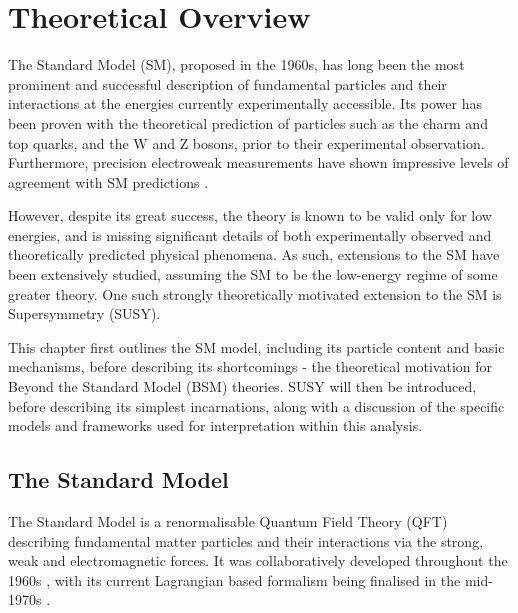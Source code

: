 
\chapter{Theoretical Overview}
\label{ch:theory}

\ifpdf
    \graphicspath{{Chapter2/Figs/Raster/}{Chapter2/Figs/PDF/}{Chapter2/Figs/}}
\else
    \graphicspath{{Chapter2/Figs/Vector/}{Chapter2/Figs/}}
\fi



The Standard Model (SM), proposed in the 1960s, has long been the most prominent and
successful description of fundamental particles and their interactions at the
energies currently experimentally accessible. Its power has been proven with the 
theoretical prediction of particles such as the charm and top quarks, and the W
and Z bosons, prior to their experimental observation. Furthermore, precision 
electroweak measurements have shown impressive levels of  agreement with SM
predictions \cite{ALEPH:2010aa}.

However, despite its great success, the theory is known to be valid only for low 
energies, and is missing significant details of both experimentally 
observed and theoretically predicted physical phenomena. As such, extensions to
the SM have been extensively studied, assuming the SM to be the low-energy 
regime of some greater theory. One such strongly theoretically motivated
extension to the SM is Supersymmetry (SUSY).

This chapter first outlines the SM model, including its particle content and basic 
mechanisms, before describing its shortcomings - the theoretical 
motivation for Beyond the Standard Model (BSM) theories. SUSY will then be 
introduced, before describing its simplest incarnations, along with a discussion
of the specific models and frameworks used for interpretation within this
analysis.

\section{The Standard Model}
\label{sec:theory_current}

The Standard Model is a renormalisable Quantum Field Theory (QFT) describing
fundamental matter particles and their interactions via the strong,
weak and electromagnetic forces. It was collaboratively developed throughout the
1960s \cite
{Glashow1961579,PhysRevLett.19.1264,Salam:1968rm,PhysRevLett.30.1346,PhysRevLett.30.1343}, with its current Lagrangian
based formalism being finalised in the mid-1970s \cite{martinAndShaw}.

